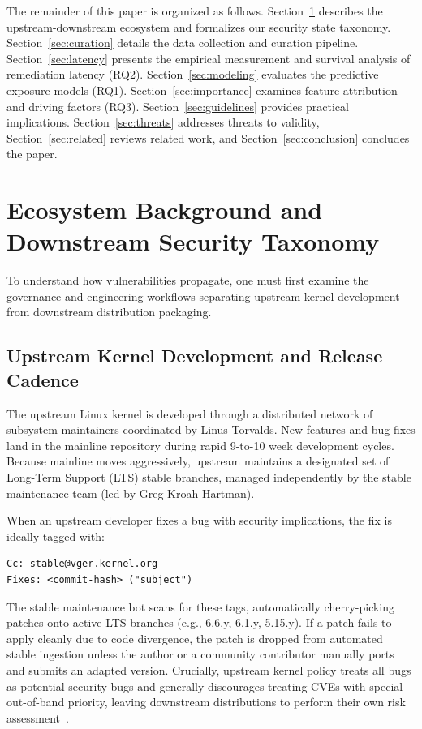 \documentclass[final,5p,times,twocolumn]{elsarticle}
\begin{document}
The remainder of this paper is organized as follows. Section~\ref{sec:background} describes the upstream-downstream ecosystem and formalizes our security state taxonomy. Section~\ref{sec:curation} details the data collection and curation pipeline. Section~\ref{sec:latency} presents the empirical measurement and survival analysis of remediation latency (RQ2). Section~\ref{sec:modeling} evaluates the predictive exposure models (RQ1). Section~\ref{sec:importance} examines feature attribution and driving factors (RQ3). Section~\ref{sec:guidelines} provides practical implications. Section~\ref{sec:threats} addresses threats to validity, Section~\ref{sec:related} reviews related work, and Section~\ref{sec:conclusion} concludes the paper.

\section{Ecosystem Background and Downstream Security Taxonomy}
\label{sec:background}

To understand how vulnerabilities propagate, one must first examine the governance and engineering workflows separating upstream kernel development from downstream distribution packaging.

\subsection{Upstream Kernel Development and Release Cadence}
The upstream Linux kernel is developed through a distributed network of subsystem maintainers coordinated by Linus Torvalds. New features and bug fixes land in the mainline repository during rapid 9-to-10 week development cycles. Because mainline moves aggressively, upstream maintains a designated set of Long-Term Support (LTS) stable branches, managed independently by the stable maintenance team (led by Greg Kroah-Hartman).

When an upstream developer fixes a bug with security implications, the fix is ideally tagged with:
\begin{verbatim}
Cc: stable@vger.kernel.org
Fixes: <commit-hash> ("subject")
\end{verbatim}
The stable maintenance bot scans for these tags, automatically cherry-picking patches onto active LTS branches (e.g., 6.6.y, 6.1.y, 5.15.y). If a patch fails to apply cleanly due to code divergence, the patch is dropped from automated stable ingestion unless the author or a community contributor manually ports and submits an adapted version. Crucially, upstream kernel policy treats all bugs as potential security bugs and generally discourages treating CVEs with special out-of-band priority, leaving downstream distributions to perform their own risk assessment~\citep{wang2020empirical}.
\end{document}
